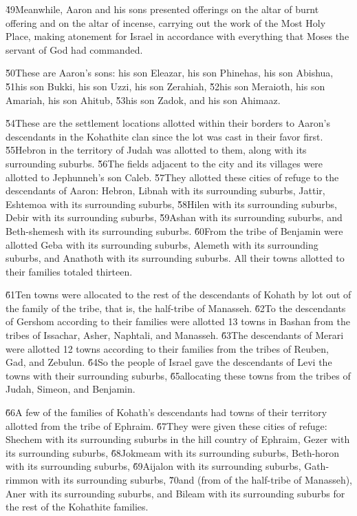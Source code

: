 \v{49}Meanwhile, Aaron and his sons presented offerings on the altar of burnt offering and on the altar of incense, carrying out the work of the Most Holy Place, making atonement for Israel in accordance with everything that Moses the servant of God had commanded.

\v{50}These are Aaron's sons: his son Eleazar, his son Phinehas, his son Abishua, \v{51}his son Bukki, his son Uzzi, his son Zerahiah, \v{52}his son Meraioth, his son Amariah, his son Ahitub, \v{53}his son Zadok, and his son Ahimaaz.

\v{54}These are the settlement locations allotted within their borders to Aaron's descendants in the Kohathite clan since the lot was cast in their favor first. \v{55}Hebron in the territory of Judah was allotted to them, along with its surrounding suburbs. \v{56}The fields adjacent to the city and its villages were allotted to Jephunneh's son Caleb. \v{57}They allotted these cities of refuge to the descendants of Aaron: Hebron, Libnah with its surrounding suburbs, Jattir, Eshtemoa with its surrounding suburbs, \v{58}Hilen with its surrounding suburbs, Debir with its surrounding suburbs, \v{59}Ashan with its surrounding suburbs, and Beth-shemesh with its surrounding suburbs. \v{60}From the tribe of Benjamin were allotted Geba with its surrounding suburbs, Alemeth with its surrounding suburbs, and Anathoth with its surrounding suburbs. All their towns allotted to their families totaled thirteen.

\v{61}Ten towns were allocated to the rest of the descendants of Kohath by lot out of the family of the tribe, that is, the half-tribe of Manasseh. \v{62}To the descendants of Gershom according to their families were allotted 13 towns in Bashan from the tribes of Issachar, Asher, Naphtali, and Manasseh. \v{63}The descendants of Merari were allotted 12 towns according to their families from the tribes of Reuben, Gad, and Zebulun. \v{64}So the people of Israel gave the descendants of Levi the towns with their surrounding suburbs, \v{65}allocating these towns from the tribes of Judah, Simeon, and Benjamin.

\v{66}A few of the families of Kohath's descendants had towns of their territory allotted from the tribe of Ephraim. \v{67}They were given these cities of refuge: Shechem with its surrounding suburbs in the hill country of Ephraim, Gezer with its surrounding suburbs, \v{68}Jokmeam with its surrounding suburbs, Beth-horon with its surrounding suburbs, \v{69}Aijalon with its surrounding suburbs, Gath-rimmon with its surrounding suburbs, \v{70}and (from of the half-tribe of Manasseh), Aner with its surrounding suburbs, and Bileam with its surrounding suburbs for the rest of the Kohathite families.

